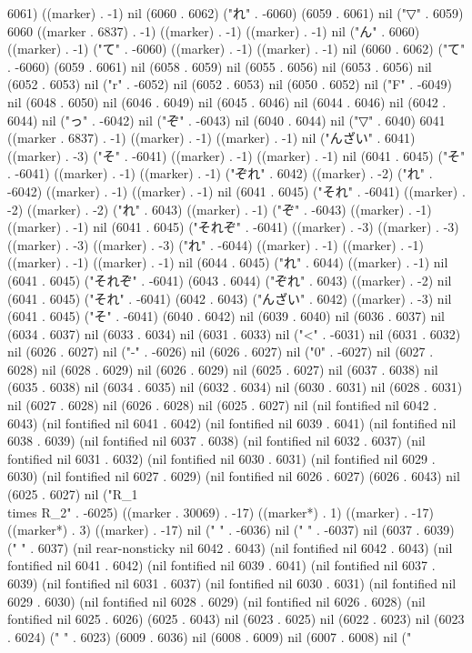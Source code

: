 6061) ((marker) . -1) nil (6060 . 6062) ("れ" . -6060) (6059 . 6061) nil ("▽" . 6059) 6060 ((marker . 6837) . -1) ((marker) . -1) ((marker) . -1) nil ("ん" . 6060) ((marker) . -1) ("て" . -6060) ((marker) . -1) ((marker) . -1) nil (6060 . 6062) ("て" . -6060) (6059 . 6061) nil (6058 . 6059) nil (6055 . 6056) nil (6053 . 6056) nil (6052 . 6053) nil ("r" . -6052) nil (6052 . 6053) nil (6050 . 6052) nil ("F" . -6049) nil (6048 . 6050) nil (6046 . 6049) nil (6045 . 6046) nil (6044 . 6046) nil (6042 . 6044) nil ("っ" . -6042) nil ("ぞ" . -6043) nil (6040 . 6044) nil ("▽" . 6040) 6041 ((marker . 6837) . -1) ((marker) . -1) ((marker) . -1) nil ("んざい" . 6041) ((marker) . -3) ("そ" . -6041) ((marker) . -1) ((marker) . -1) nil (6041 . 6045) ("そ" . -6041) ((marker) . -1) ((marker) . -1) ("ぞれ" . 6042) ((marker) . -2) ("れ" . -6042) ((marker) . -1) ((marker) . -1) nil (6041 . 6045) ("それ" . -6041) ((marker) . -2) ((marker) . -2) ("れ" . 6043) ((marker) . -1) ("ぞ" . -6043) ((marker) . -1) ((marker) . -1) nil (6041 . 6045) ("それぞ" . -6041) ((marker) . -3) ((marker) . -3) ((marker) . -3) ((marker) . -3) ("れ" . -6044) ((marker) . -1) ((marker) . -1) ((marker) . -1) ((marker) . -1) nil (6044 . 6045) ("れ" . 6044) ((marker) . -1) nil (6041 . 6045) ("それぞ" . -6041) (6043 . 6044) ("ぞれ" . 6043) ((marker) . -2) nil (6041 . 6045) ("それ" . -6041) (6042 . 6043) ("んざい" . 6042) ((marker) . -3) nil (6041 . 6045) ("そ" . -6041) (6040 . 6042) nil (6039 . 6040) nil (6036 . 6037) nil (6034 . 6037) nil (6033 . 6034) nil (6031 . 6033) nil ("<" . -6031) nil (6031 . 6032) nil (6026 . 6027) nil ("-" . -6026) nil (6026 . 6027) nil ("0" . -6027) nil (6027 . 6028) nil (6028 . 6029) nil (6026 . 6029) nil (6025 . 6027) nil (6037 . 6038) nil (6035 . 6038) nil (6034 . 6035) nil (6032 . 6034) nil (6030 . 6031) nil (6028 . 6031) nil (6027 . 6028) nil (6026 . 6028) nil (6025 . 6027) nil (nil fontified nil 6042 . 6043) (nil fontified nil 6041 . 6042) (nil fontified nil 6039 . 6041) (nil fontified nil 6038 . 6039) (nil fontified nil 6037 . 6038) (nil fontified nil 6032 . 6037) (nil fontified nil 6031 . 6032) (nil fontified nil 6030 . 6031) (nil fontified nil 6029 . 6030) (nil fontified nil 6027 . 6029) (nil fontified nil 6026 . 6027) (6026 . 6043) nil (6025 . 6027) nil ("R_{1}\\times R_{2}" . -6025) ((marker . 30069) . -17) ((marker*) . 1) ((marker) . -17) ((marker*) . 3) ((marker) . -17) nil ("
" . -6036) nil (" " . -6037) nil (6037 . 6039) (" " . 6037) (nil rear-nonsticky nil 6042 . 6043) (nil fontified nil 6042 . 6043) (nil fontified nil 6041 . 6042) (nil fontified nil 6039 . 6041) (nil fontified nil 6037 . 6039) (nil fontified nil 6031 . 6037) (nil fontified nil 6030 . 6031) (nil fontified nil 6029 . 6030) (nil fontified nil 6028 . 6029) (nil fontified nil 6026 . 6028) (nil fontified nil 6025 . 6026) (6025 . 6043) nil (6023 . 6025) nil (6022 . 6023) nil (6023 . 6024) ("  " . 6023) (6009 . 6036) nil (6008 . 6009) nil (6007 . 6008) nil ("
